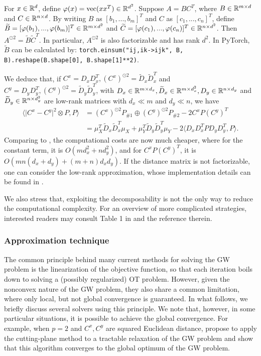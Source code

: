 \begin{lemma}
  For $x \in \mathbb R^d$, define $\varphi(x) = \text{vec}(xx^T) \in \mathbb R^{d^2}$.
  Suppose $A = B C^T$, where $B \in \mathbb R^{m \times d}$ and $C \in \mathbb R^{n \times d}$.
  By writing $B$ as $[b_1, ..., b_m]^T$ and $C$ as $[c_1, ..., c_n]^T$, define
  $\widetilde{B} = [\varphi(b_1), ..., \varphi(b_m)]^T \in \mathbb R^{m \times d^2}$ and
  $\widetilde{C} = [\varphi(c_1), ..., \varphi(c_n)]^T \in \mathbb R^{n \times d^2}$.
  Then $A^{\odot 2} = \widetilde{B} \widetilde{C}^T$. In particular, $A^{\odot 2}$ is also
  factorizable and has rank $d^2$. In PyTorch, $\widetilde{B}$ can be calculated by:
  \texttt{torch.einsum("ij,ik->ijk", B, B).reshape(B.shape[0], B.shape[1]**2)}.
\end{lemma}
We deduce that, if $C^x = D_x D_x^T, (C^x)^{\odot 2} = \widetilde{D}_x \widetilde{D}_x^T$
and $C^y = D_y D_y^T, (C^y)^{\odot 2} = \widetilde{D}_y \widetilde{D}_y^T$,
with $D_x \in \mathbb R^{m \times d_x}, \widetilde{D}_x \in \mathbb R^{m \times d_x^2},
D_y \in \mathbb R^{n \times d_y}$ and $\widetilde{D}_y \in \mathbb R^{n \times d_y^2}$ are low-rank matrices
with $d_x \ll m$ and $d_y \ll n$, we have
\begin{align}
  \langle \vert C^x - C^y \vert^2 \otimes P, P \rangle
  &= (C^x)^{\odot 2} P_{\# 1} \oplus (C^y)^{\odot 2} P_{\# 2} - 2 C^x P (C^y)^T \\
  &= \mu_X^T \widetilde{D}_x \widetilde{D}_x^T \mu_X
  + \mu_Y^T \widetilde{D}_y \widetilde{D}_y^T \mu_Y - 2 \langle D_x D_x^T P D_y D_y^T, P \rangle.
\end{align}
Comparing to , the computational costs are now much cheaper,
where for the constant term, it is $O(m d_x^2 + n d_y^2)$, and for $C^x P (C^y)^T$,
it is $O(mn(d_x + d_y) + (m+n) d_x d_y)$. If the distance matrix is not factorizable,
one can consider the low-rank approximation,
whose implementation details can be found in \citep{Meyer21a}.

We also stress that, exploiting the decomposability is not the only way to reduce the computational
complexity. For an overview of more complicated strategies,
interested readers may consult Table 1 in \citep{Li23} and the reference therein.

\subsubsection{Approximation technique} \label{subsec:gw_approx}
The common principle behind many current methods for solving the GW problem
is the linearization of the objective function,
so that each iteration boils down to solving a (possibly regularized)
OT problem. However, given the nonconvex nature of the GW problem, they also share
a common limitation, where only local, but not global convergence is guaranteed.
In what follows, we briefly discuss several solvers using this principle.
We note that, however, in some particular situations, it is possible to achieve the
global convergence. For example, when $p=2$ and $C^x, C^y$ are squared Euclidean distance,
\citep{Ryner23} propose to apply the cutting-plane method to a tractable relaxation of the GW problem
and show that this algorithm converges to the global optimum of the GW problem.

